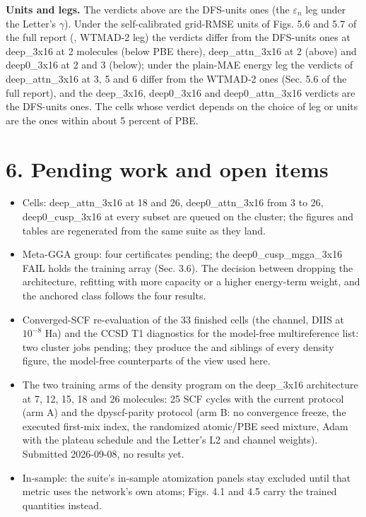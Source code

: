\documentclass[10pt,a4paper]{article}
\begin{document}
\textbf{Units and legs.} The verdicts above are the DFS-units ones (the $\varepsilon_n$ leg under the Letter's $\gamma$). Under the self-calibrated grid-RMSE units of Figs. 5.6 and 5.7 of the full report (, WTMAD-2 leg) the verdicts differ from the DFS-units ones at deep\_3x16 at 2 molecules (below PBE there), deep\_attn\_3x16 at 2 (above) and deep0\_3x16 at 2 and 3 (below); under the plain-MAE energy leg the verdicts of deep\_attn\_3x16 at 3, 5 and 6 differ from the WTMAD-2 ones (Sec. 5.6 of the full report), and the deep\_3x16, deep0\_3x16 and deep0\_attn\_3x16 verdicts are the DFS-units ones. The cells whose verdict depends on the choice of leg or units are the ones within about 5 percent of PBE.

\section*{6. Pending work and open items}

\begin{itemize}
\item Cells: deep\_attn\_3x16 at 18 and 26, deep0\_attn\_3x16 from 3 to 26, deep0\_cusp\_3x16 at every subset are queued on the cluster; the figures and tables are regenerated from the same suite as they land.
\item Meta-GGA group: four certificates pending; the deep0\_cusp\_mgga\_3x16 FAIL holds the training array (Sec. 3.6). The decision between dropping the architecture, refitting with more capacity or a higher energy-term weight, and the anchored class follows the four results.
\item Converged-SCF re-evaluation of the 33 finished cells (the  channel, DIIS at $10^{-8}$ Ha) and the CCSD T1 diagnostics for the model-free multireference list: two cluster jobs pending; they produce the  and  siblings of every density figure, the model-free counterparts of the  view used here.
\item The two training arms of the density program on the deep\_3x16 architecture at 7, 12, 15, 18 and 26 molecules: 25 SCF cycles with the current protocol (arm A) and the dpyscf-parity protocol (arm B: no convergence freeze, the executed first-mix index, the randomized atomic/PBE seed mixture, Adam with the plateau schedule and the Letter's L2 and channel weights). Submitted 2026-09-08, no results yet.
\item In-sample: the suite's in-sample atomization panels stay excluded until that metric uses the network's own atoms; Figs. 4.1 and 4.5 carry the trained quantities instead.
\end{itemize}
\end{document}
